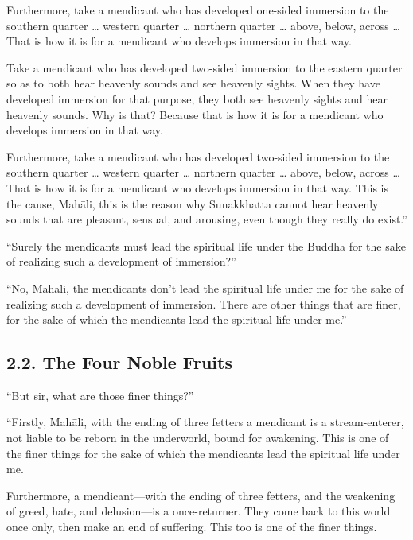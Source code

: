 \documentclass[12pt,openany]{book}%
\begin{document}
Furthermore, take a mendicant who has developed one-sided immersion to the southern quarter … western quarter … northern quarter … above, below, across … That is how it is for a mendicant who develops immersion in that way. 

Take a mendicant who has developed two-sided immersion to the eastern quarter so as to both hear heavenly sounds and see heavenly sights. When they have developed immersion for that purpose, they both see heavenly sights and hear heavenly sounds. Why is that? Because that is how it is for a mendicant who develops immersion in that way. 

Furthermore, take a mendicant who has developed two-sided immersion to the southern quarter … western quarter … northern quarter … above, below, across … That is how it is for a mendicant who develops immersion in that way. This is the cause, \textsanskrit{Mahāli}, this is the reason why Sunakkhatta cannot hear heavenly sounds that are pleasant, sensual, and arousing, even though they really do exist.” 

“Surely the mendicants must lead the spiritual life under the Buddha for the sake of realizing such a development of immersion?” 

“No, \textsanskrit{Mahāli}, the mendicants don’t lead the spiritual life under me for the sake of realizing such a development of immersion. There are other things that are finer, for the sake of which the mendicants lead the spiritual life under me.” 

\subsection*{2.2. The Four Noble Fruits }

“But sir, what are those finer things?” 

“Firstly, \textsanskrit{Mahāli}, with the ending of three fetters a mendicant is a stream-enterer, not liable to be reborn in the underworld, bound for awakening. This is one of the finer things for the sake of which the mendicants lead the spiritual life under me. 

Furthermore, a mendicant—with the ending of three fetters, and the weakening of greed, hate, and delusion—is a once-returner. They come back to this world once only, then make an end of suffering. This too is one of the finer things. 
\end{document}
